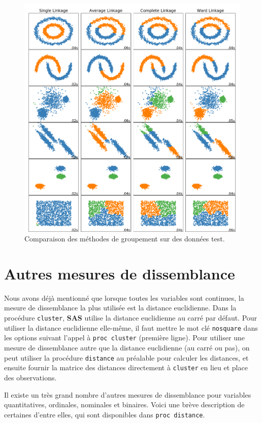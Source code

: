 \documentclass[
  11pt,
  letterpaper,
]{book}
\theoremstyle{definition}
\theoremstyle{definition}
\theoremstyle{definition}
\theoremstyle{remark}
\begin{document}
\begin{figure}

{\centering \includegraphics[width=0.8\linewidth]{figures/04-clustering-e20} 

}

\caption{Comparaison des méthodes de groupement sur des données test.}\label{fig:fig4-e20}
\end{figure}

\hypertarget{autres-mesures-de-dissemblance}{%
\section{Autres mesures de dissemblance}\label{autres-mesures-de-dissemblance}}

Nous avons déjà mentionné que lorsque toutes les variables sont continues, la mesure de dissemblance la plus utilisée est la distance euclidienne. Dans la procédure \texttt{cluster}, \textbf{SAS} utilise la distance euclidienne au carré par défaut. Pour utiliser la distance euclidienne elle-même, il faut mettre le mot clé \texttt{nosquare} dans les options suivant l'appel à \texttt{proc\ cluster} (première ligne). Pour utiliser une mesure de dissemblance autre que la distance euclidienne (au carré ou pas), on peut utiliser la procédure \texttt{distance} au préalable pour calculer les distances, et ensuite fournir la matrice des distances directement à \texttt{cluster} en lieu et place des observations.

Il existe un très grand nombre d'autres mesures de dissemblance pour variables quantitatives, ordinales, nominales et binaires. Voici une brève description de certaines d'entre elles, qui sont disponibles dans \texttt{proc\ distance}.
\end{document}
